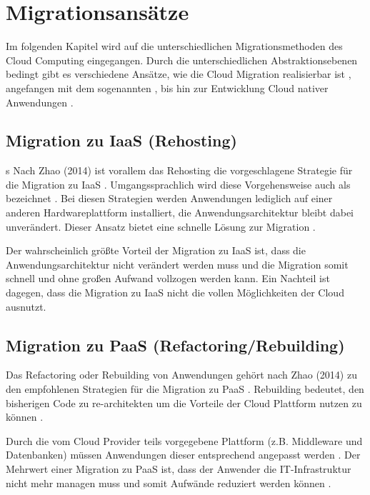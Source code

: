 \section{Migrationsansätze}

Im folgenden Kapitel wird auf die unterschiedlichen Migrationsmethoden des Cloud Computing eingegangen.
Durch die unterschiedlichen Abstraktionsebenen bedingt gibt es verschiedene Ansätze, wie die Cloud Migration realisierbar ist \cite[Vgl.][S. 226]{Surianarayanan2019},
angefangen mit dem sogenannten \grqq{}, bis hin zur Entwicklung Cloud nativer Anwendungen \cite[Vgl.][S. 144]{Zhao2014}.

\subsection{Migration zu IaaS (Rehosting)}s
Nach Zhao (2014) ist vorallem das Rehosting die vorgeschlagene Strategie für die Migration zu \ac{IaaS} \cite[Vgl.][S. 144]{Zhao2014}.
Umgangssprachlich wird diese Vorgehensweise auch als \grqq{} bezeichnet \cite[Vgl.][]{NetApp}.
Bei diesen Strategien werden Anwendungen lediglich auf einer anderen Hardwareplattform installiert, die Anwendungsarchitektur bleibt dabei
unverändert. Dieser Ansatz bietet eine schnelle Lösung zur Migration \cite[Vgl.][]{CIO}.

Der wahrscheinlich größte Vorteil der Migration zu \ac{IaaS} ist, dass die Anwendungsarchitektur nicht verändert werden muss und die Migration somit
schnell und ohne großen Aufwand vollzogen werden kann. Ein Nachteil ist dagegen, dass die Migration zu \ac{IaaS} nicht die vollen Möglichkeiten der
Cloud ausnutzt.

\subsection{Migration zu PaaS (Refactoring/Rebuilding)}
Das Refactoring oder Rebuilding von Anwendungen gehört nach Zhao (2014) zu den empfohlenen Strategien für die Migration zu \ac{PaaS} \cite[Vgl.][S. 144]{Zhao2014}.
Rebuilding bedeutet, den bisherigen Code zu re-architekten um die Vorteile der Cloud Plattform nutzen zu können \cite[Vgl.][]{CIO}.

Durch die vom Cloud Provider teils vorgegebene Plattform (z.B. Middleware und Datenbanken) müssen Anwendungen dieser entsprechend angepasst werden \cite[Vgl.][S. 227]{Surianarayanan2019}.
Der Mehrwert einer Migration zu \ac{PaaS} ist, dass der Anwender die IT-Infrastruktur nicht mehr managen muss und somit Aufwände reduziert werden können
\cite[Vgl.][S. 6]{Pahl}.

